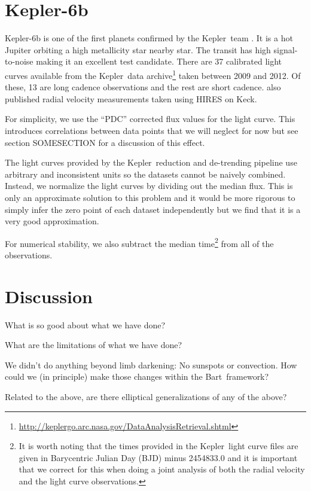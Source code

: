 \documentclass[12pt,preprint]{aastex}
\newcommand{\project}[1]{{\sffamily #1}}
\newcommand{\bart}{\project{Bart}}
\newcommand{\kepler}{\project{Kepler}}
\begin{document}
\section{Kepler-6b}

Kepler-6b is one of the first planets confirmed by the \kepler\ team
\citep{kepler6b}.
It is a hot Jupiter orbiting a high metallicity star nearby star.
The transit has high signal-to-noise making it an excellent test candidate.
There are 37 calibrated light curves available from the \kepler\ data
archive\footnote{%
\url{http://keplergo.arc.nasa.gov/DataAnalysisRetrieval.shtml}} taken between
2009 and 2012.
Of these, 13 are long cadence observations and the rest are short cadence.
\citet{kepler6b} also published radial velocity measurements taken using HIRES
on Keck.

For simplicity, we use the ``PDC'' corrected flux values for the light curve.
This introduces correlations between data points that we will neglect for now
but see section SOMESECTION for a discussion of this effect.

The light curves provided by the \kepler\ reduction and de-trending pipeline
use arbitrary and inconsistent units so the datasets cannot be naively
combined.
Instead, we normalize the light curves by dividing out the median flux.
This is only an approximate solution to this problem and it would be more
rigorous to simply infer the zero point of each dataset independently but we
find that it is a very good approximation.

For numerical stability, we also subtract the median time\footnote{It is worth
noting that the times provided in the \kepler\ light curve files are given in
Barycentric Julian Day (BJD) minus 2454833.0 and it is important that we
correct for this when doing a joint analysis of both the radial velocity and
the light curve observations.} from all of the observations.


\section{Discussion}

What is so good about what we have done?

What are the limitations of what we have done?

We didn't do anything beyond limb darkening:  No sunspots or convection.
How could we (in principle) make those changes within the \bart\ framework?

Related to the above, are there elliptical generalizations of any of the above?
\end{document}
